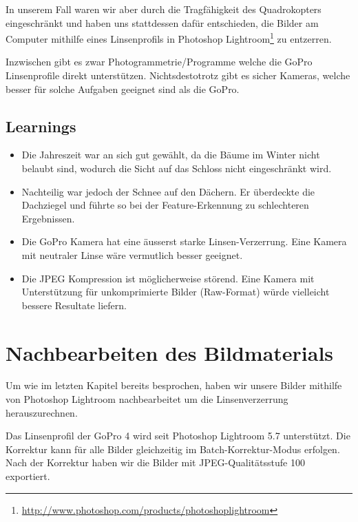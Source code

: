 In unserem Fall waren wir aber durch die Tragfähigkeit des Quadrokopters
eingeschränkt und haben uns stattdessen dafür entschieden, die Bilder am
Computer mithilfe eines Linsenprofils in Photoshop
Lightroom\footnote{\url{http://www.photoshop.com/products/photoshoplightroom}}
zu entzerren.

Inzwischen gibt es zwar Photogrammetrie\-/Programme welche die GoPro
Linsenprofile direkt unterstützen. Nichtsdestotrotz gibt es sicher Kameras,
welche besser für solche Aufgaben geeignet sind als die GoPro.

\subsection{Learnings}

\begin{itemize}
	\item Die Jahreszeit war an sich gut gewählt, da die Bäume im Winter nicht
		belaubt sind, wodurch die Sicht auf das Schloss nicht eingeschränkt wird.
	\item Nachteilig war jedoch der Schnee auf den Dächern. Er überdeckte die
		Dachziegel und führte so bei der Feature-Erkennung zu schlechteren
		Ergebnissen.
	\item Die GoPro Kamera hat eine äusserst starke Linsen-Verzerrung. Eine Kamera
		mit neutraler Linse wäre vermutlich besser geeignet.
	\item Die JPEG Kompression ist möglicherweise störend. Eine Kamera mit
		Unterstützung für unkomprimierte Bilder (Raw-Format) würde vielleicht
		bessere Resultate liefern.
\end{itemize}


\section{Nachbearbeiten des Bildmaterials}

\label{sec:image-correction}

Um wie im letzten Kapitel bereits besprochen, haben wir unsere Bilder mithilfe
von Photoshop Lightroom nachbearbeitet um die Linsenverzerrung herauszurechnen.

Das Linsenprofil der GoPro 4 wird seit Photoshop Lightroom 5.7 unterstützt. Die
Korrektur kann für alle Bilder gleichzeitig im Batch-Korrektur-Modus erfolgen.
Nach der Korrektur haben wir die Bilder mit JPEG-Qualitätsstufe 100 exportiert.

